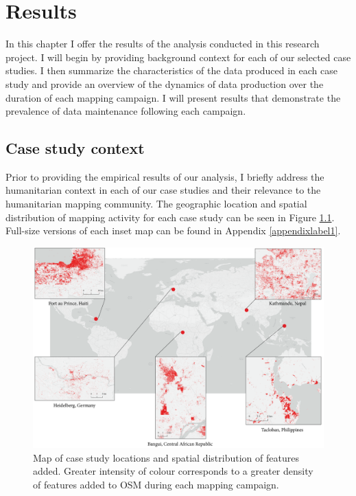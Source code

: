 \chapter{Results}
\label{chapterlabel5}

In this chapter I offer the results of the analysis conducted in this research project. I will begin by providing background context for each of our selected case studies. I then summarize the characteristics of the data produced in each case study and provide an overview of the dynamics of data production over the duration of each mapping campaign. I will present results that demonstrate the prevalence of data maintenance following each campaign. 

\section{Case study context}

Prior to providing the empirical results of our analysis, I briefly address the humanitarian context in each of our case studies and their relevance to the humanitarian mapping community. The geographic location and spatial distribution of mapping activity for each case study can be seen in Figure \ref{fig:map}. Full-size versions of each inset map can be found in Appendix \ref{appendixlabel1}. 

\begin{figure} %
    \centering %
    \includegraphics[width = \textwidth]{Images/sum_map.png} %
    \caption[Map of case study locations and spatial distribution of features added.]{Map of case study locations and spatial distribution of features added. Greater intensity of colour corresponds to a greater density of features added to OSM during each mapping campaign.} %
    \label{fig:map} %
\end{figure}

